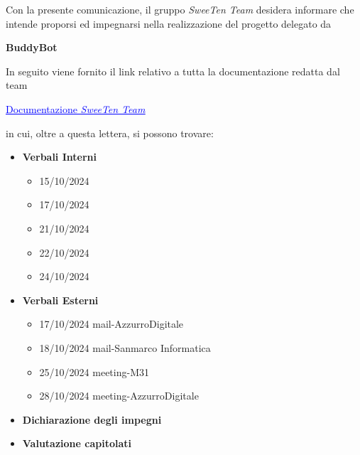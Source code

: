 \documentclass[italian, 11pt]{article}
\begin{document}
\pagestyle{mystyle}


\newpage

Con la presente comunicazione, il gruppo \textit{SweeTen Team} desidera informare che intende proporsi ed impegnarsi nella realizzazione del progetto delegato da \hspace{0.1em} 
\begin{center}
  \textbf{BuddyBot}
\end{center}
In seguito viene fornito il link relativo a tutta la documentazione redatta dal team
\begin{center}
  \href{https://github.com/SweeTenTeam/Docs}{\textcolor{blue}{\underline{Documentazione \textit{SweeTen Team}}}}
\end{center}
in cui, oltre a questa lettera, si possono trovare:
\begin{itemize}
    \item \textbf{Verbali Interni}
    \begin{itemize}
        \item 15/10/2024
        \item 17/10/2024
        \item 21/10/2024
        \item 22/10/2024
        \item 24/10/2024
    \end{itemize}
    
    \item \textbf{Verbali Esterni}
    \begin{itemize}
        \item 17/10/2024 mail-AzzurroDigitale
        \item 18/10/2024 mail-Sanmarco Informatica 
        \item 25/10/2024 meeting-M31
        \item 28/10/2024 meeting-AzzurroDigitale
    \end{itemize}
    \item \textbf{Dichiarazione degli impegni}
    \item \textbf{Valutazione capitolati}
\end{itemize}
\end{document}

